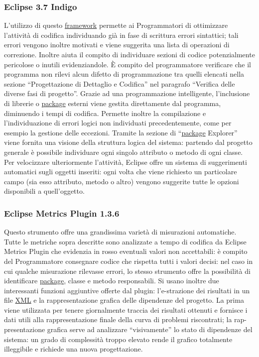 \documentclass[a4paper,11pt]{article}
\begin{document}
\subsubsection{Eclipse 3.7 Indigo}
L'utilizzo di questo \underline{framework} permette ai Programmatori di ottimizzare l'attivit\`a di codifica individuando gi\`a in fase di scrittura errori sintattici; 
tali errori vengono inoltre motivati e viene suggerita una lista di operazioni di correzione. 
Inoltre aiuta il compito di individuare sezioni di codice potenzialmente pericolose o inutili evidenziandole. \`E compito del programmatore verificare che il programma
non rilevi alcun difetto di programmazione tra quelli elencati nella sezione ``Progettazione di Dettaglio e Codifica'' nel paragrafo ``Verifica delle diverse fasi di progetto''.
Grazie ad una programmazione intelligente, l'inclusione di librerie o \underline{package} esterni viene gestita direttamente dal programma, diminuendo i tempi di codifica.
Permette inoltre la compilazione e l'individuazione di errori logici non individuati precedentemente, come per esempio la gestione delle eccezioni.
Tramite la sezione di ``\underline{package} Explorer'' viene fornita una visione della struttura logica del sistema: partendo dal progetto generale \`e possibile individuare ogni singolo attributo o metodo di ogni classe.
Per velocizzare ulteriormente l'attivit\`a, Eclipse offre un sistema di suggerimenti automatici sugli oggetti inseriti: ogni volta che viene richiesto un particolare
 campo (sia esso attributo, metodo o altro) vengono suggerite tutte le opzioni disponibili a quell'oggetto.

\subsubsection{Eclipse Metrics Plugin 1.3.6}
Questo strumento offre una grandissima variet\`a di misurazioni automatiche. Tutte le metriche sopra descritte sono analizzate a tempo di codifica da Eclipse Metrics Plugin che evidenzia in rosso eventuali valori non accettabili: \`e compito del Programmatore consegnare codice che rispetta tutti i valori decisi: nel caso in cui qualche misurazione rilevasse errori, lo stesso strumento offre la possibilit\`a di identificare \underline{package}, classe e metodo responsabili. Si usano inoltre due interessanti funzioni aggiuntive offerte dal plugin: l'e-strazione dei risultati in un file \underline{XML} e la rappresentazione grafica delle dipendenze del progetto. La prima viene utilizzata per tenere giornalmente traccia dei risultati ottenuti e fornisce i dati utili alla rappresentazione finale della curva di problemi riscontrati; la rap-presentazione grafica serve ad analizzare ``visivamente'' lo stato di dipendenze del sistema: un grado di complessit\`a troppo elevato rende il grafico totalmente illeggibile e richiede una nuova progettazione. 
\end{document}
